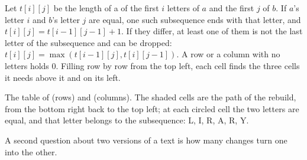 Let $t[i][j]$ be the length of a  of the first $i$ letters of $a$ and the first $j$ of $b$.
If $a$'s letter $i$ and $b$'s letter $j$ are equal, one such subsequence ends with that letter, and
$t[i][j] = t[i - 1][j - 1] + 1$. If they differ, at least one of them is not the last letter of the subsequence and can
be dropped: $t[i][j] = \max(t[i - 1][j], t[i][j - 1])$. A row or a column with no letters holds $0$. Filling row by row
from the top left, each cell finds the three cells it needs above it and on its left.

\label{lst:g12:dynamic-programming:lcs}

\label{out:g12:dynamic-programming:lcs}

\begin{omfigure}

{\small The table of  (rows) and  (columns). The shaded cells are the path of the
rebuild, from the bottom right back to the top left; at each circled cell the two letters are equal, and that letter
belongs to the subsequence: L, I, R, A, R, Y.}
\end{omfigure}

A second question about two versions of a text is how many changes turn one into the other.

